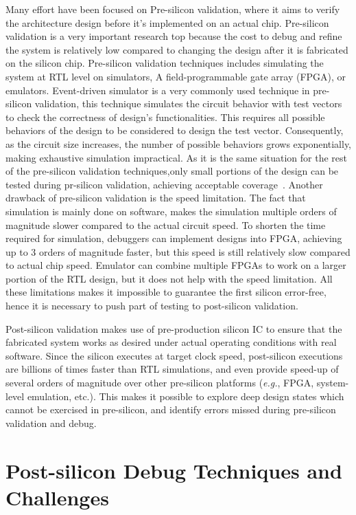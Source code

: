 \documentclass[12pt,frontmatter,copyright,thesis]{usfmanus}
\newcommand{\eg}{\mbox{{\em e.g.}}}
\begin{document}
Many effort have been focused on Pre-silicon validation,
where it aims to verify the architecture design before 
it's implemented on an actual chip. 
Pre-silicon validation
is a very important research top because
the cost to debug and refine the system is relatively low compared 
to changing the design after it is
fabricated on the silicon chip.
Pre-silicon validation techniques includes 
simulating the system at RTL level on simulators, A field-programmable gate array (FPGA), or emulators. 
Event-driven simulator is a very commonly used technique in pre-silicon validation,
this technique simulates the circuit behavior with test vectors to
check the correctness of design's functionalities. This requires
all possible behaviors of the design to be considered to design
the test vector. Consequently, as the circuit size increases, 
the number of possible behaviors grows exponentially, making
exhaustive simulation impractical. 
As it is the same situation for the rest of the pre-silicon
validation techniques,only small portions of the design
can be tested during pr-silicon validation, achieving
acceptable coverage~\cite{liu2014trace}.
Another drawback of pre-silicon validation is the speed limitation. 
The fact that
simulation is mainly done on software, makes the simulation
multiple orders
of magnitude slower compared to the actual circuit speed.
To shorten the time required for simulation, 
debuggers can implement designs into FPGA,
achieving up to 3 orders of magnitude faster,
but this speed is still relatively slow compared to actual 
chip speed. 
Emulator can combine multiple FPGAs
to work on a larger portion of the RTL design,
but it does not help with the speed limitation.
All these limitations makes it
impossible to guarantee the first silicon error-free, 
hence it is necessary to
push part of testing to post-silicon validation.

Post-silicon validation makes use of pre-production silicon
IC to ensure that the fabricated system
works as desired under actual operating conditions with real
software.  Since the silicon executes at target clock speed,
post-silicon executions are billions of times faster than
RTL simulations, and even provide speed-up of several orders
of magnitude over other pre-silicon platforms (\eg, FPGA,
system-level emulation, etc.).  This makes it possible to
explore deep design states which cannot be exercised in
pre-silicon, and identify errors missed during pre-silicon
validation and debug.  

\section{Post-silicon Debug Techniques and Challenges}
\end{document}

